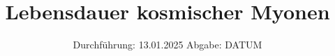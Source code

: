 
\usepackage{longtable}

\subject{v01}
\title{Lebensdauer kosmischer Myonen}
\date{%
  Durchführung: 13.01.2025
  \hspace{3em}
  Abgabe: DATUM
}



\maketitle
\thispagestyle{empty}
\tableofcontents
\newpage






\printbibliography{}


